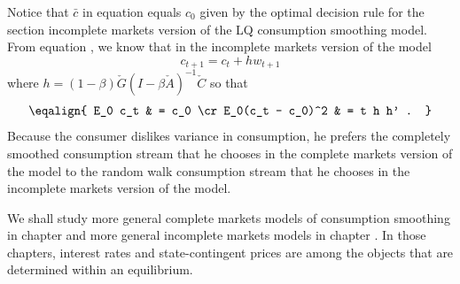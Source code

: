 Notice that $\bar c$ in equation  equals $c_0$ given by the optimal decision rule  for the section
 incomplete markets version
of the LQ consumption smoothing model.   From equation , we know that in the incomplete markets version of the model
$$ c_{t+1} = c_t + h w_{t+1} $$
where $h = (1-\beta) \check G (I - \beta \check A)^{-1} \check C $
so that 
$$ \eqalign{ E_0 c_t & = c_0 \cr
              E_0(c_t  - c_0)^2 & = t h h' . } $$
Because the consumer dislikes variance in consumption, he prefers the completely smoothed   consumption stream  that he chooses in the complete markets version of the model to the random walk consumption stream that he chooses in the incomplete markets version of the
 model.

           
We shall study  more general complete markets models of consumption smoothing in chapter 
and more general incomplete markets models in chapter
.  In those chapters, interest rates and state-contingent prices are among 
the objects that are determined within an  equilibrium.  
 


%
